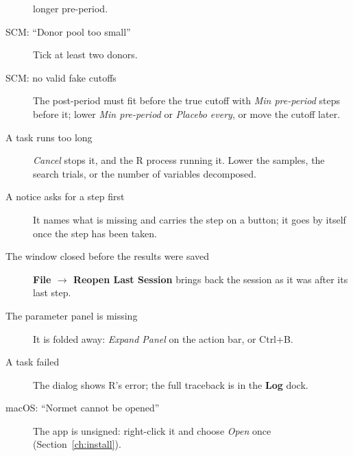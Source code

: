 \documentclass[11pt]{report}
\newcommand{\tab}[1]{\textbf{#1}}
\begin{document}
\begin{description}
        longer pre-period.
  \item[SCM: ``Donor pool too small''] Tick at least two donors.
  \item[SCM: no valid fake cutoffs] The post-period must fit before the true cutoff with
        \emph{Min pre-period} steps before it; lower \emph{Min pre-period} or
        \emph{Placebo every}, or move the cutoff later.
  \item[A task runs too long] \emph{Cancel} stops it, and the R process running it. Lower
        the samples, the search trials, or the number of variables decomposed.
  \item[A notice asks for a step first] It names what is missing and carries the step on
        a button; it goes by itself once the step has been taken.
  \item[The window closed before the results were saved] \tab{File $\rightarrow$ Reopen
        Last Session} brings back the session as it was after its last step.
  \item[The parameter panel is missing] It is folded away: \emph{Expand Panel} on the
        action bar, or Ctrl+B.
  \item[A task failed] The dialog shows R's error; the full traceback is in the
        \tab{Log} dock.
  \item[macOS: ``Normet cannot be opened''] The app is unsigned: right-click it and choose
        \emph{Open} once (Section~\ref{ch:install}).
\end{description}
\end{document}
